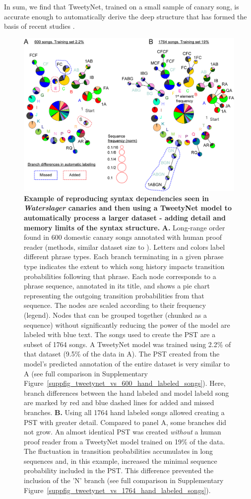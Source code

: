 \documentclass[10pt,letterpaper]{article}
\begin{document}
In sum, we find that TweetyNet, trained on a small sample of canary song, is accurate enough to automatically derive the deep structure that has formed the basis of recent studies \cite{markowitz_long-range_2013,cohen_hidden_2020}.


\begin{figure}[!ht]
\includegraphics[scale=0.85]{figures/mainfig_automatic_canary_syntax/mainfig_automatic_canary_syntax.png}
\caption{{\bf Example of reproducing syntax dependencies seen in \textit{Waterslager} canaries and then using a TweetyNet model to automatically process a larger dataset - adding detail and memory limits of the syntax structure.}
\textbf{A.} Long-range order found in 600 domestic canary songs annotated with human proof reader (methods, similar dataset size to \cite{markowitz_long-range_2013}). Letters and colors label different phrase types. Each branch terminating in a given phrase type indicates the extent to which song history impacts transition probabilities following that phrase. Each node corresponds to a phrase sequence, annotated in its title, and shows a pie chart representing the outgoing transition probabilities from that sequence. The nodes are scaled according to their frequency (legend). Nodes that can be grouped together (chunked as a sequence) without significantly reducing the power of the model are labeled with blue text. The songs used to create the PST are a subset of 1764 songs. A TweetyNet model was trained using 2.2\% of that dataset (9.5\% of the data in A). The PST created from the model's predicted annotation of the entire dataset is very similar to A (see full comparison in Supplementary Figure~\ref{suppfig_tweetynet_vs_600_hand_labeled_songs}). Here, branch differences between the hand labeled and model labeld song are marked by red and blue dashed lines for added and missed branches. \textbf{B.} Using all 1764 hand labeled songs allowed creating a PST with greater detail. Compared to panel A, some branches did not grow. An almost identical PST was created \textit{without} a human proof reader from a TweetyNet model trained on 19\% of the data. The fluctuation in transition probabilities accumulates in long sequences and, in this example, increased the minimal sequence probability included in the PST. This difference prevented the inclusion of the 'N' branch (see full comparison in Supplementary Figure~\ref{suppfig_tweetynet_vs_1764_hand_labeled_songs}).}

\end{figure}
\end{document}
